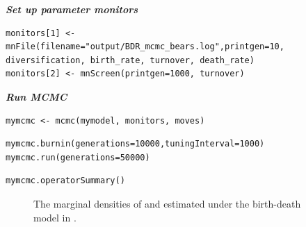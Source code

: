 \textbf{\textit{Set up parameter monitors}}


{\tt \begin{snugshade*}
\begin{lstlisting}
monitors[1] <- mnFile(filename="output/BDR_mcmc_bears.log",printgen=10, diversification, birth_rate, turnover, death_rate)
monitors[2] <- mnScreen(printgen=1000, turnover)
\end{lstlisting}
\end{snugshade*}}

\textbf{\textit{Run MCMC}}

{\tt \begin{snugshade*}
\begin{lstlisting}
mymcmc <- mcmc(mymodel, monitors, moves)
\end{lstlisting}
\end{snugshade*}}

{\tt \begin{snugshade*}
\begin{lstlisting}
mymcmc.burnin(generations=10000,tuningInterval=1000)
mymcmc.run(generations=50000)
\end{lstlisting}
\end{snugshade*}}

{\tt \begin{snugshade*}
\begin{lstlisting}
mymcmc.operatorSummary()
\end{lstlisting}
\end{snugshade*}}

\begin{figure}[h!]
\centering
{}
\caption{\small The marginal densities of  and  estimated under the birth-death model in \RevBayes.}
\label{tracerMarg}
\end{figure}


